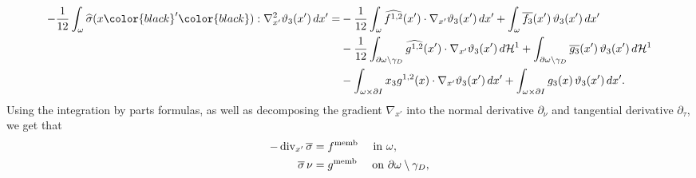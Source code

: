 \documentclass[reqno,10pt]{amsart}
\numberwithin{equation}{section}
\theoremstyle{remark}
\newcommand{\RED}{\color{black}}
\newcommand{\BLACK}{\color{black}}
\newcommand{\PINK}{\color{black}}
\newcommand{\calH}{\mathcal{H}}
\renewcommand{\div}{\operatorname{div}}
\newcommand{\fvol}{f}
\newcommand{\fsurf}{g}
\newcommand{\Dir}{D}
\newcommand{\zerothI}[1]{\overline{#1}}
\newcommand{\firstI}[1]{\widehat{#1}}
\newcommand{\D}{\nabla}
\begin{document}
\begin{equation*}
\begin{split}
	-\frac{1}{12} \int_{\omega} \firstI{\sigma}(x{\RED'\BLACK}) : {\D}^2_{x'}\vartheta_3(x') \,dx' 
	=& -\frac{1}{12} \int_{\omega} \firstI{\fvol^{1,2}}(x') \cdot \nabla_{x'}\vartheta_3(x') \,dx'
	+ \int_{\omega} \zerothI{\fvol_{3}}(x') \, \vartheta_3(x') \,dx'
	\\& -\frac{1}{12} \int_{\partial{\omega} \setminus \gamma_\Dir} \firstI{\fsurf^{1,2}}(x') \cdot \nabla_{x'}\vartheta_3(x') \,d\calH^{1}
	+ \int_{\partial{\omega} \setminus \gamma_\Dir} \zerothI{\fsurf_{3}}(x') \, \vartheta_3(x') \,d\calH^{1}
	\\& - \int_{\omega \times \partial{I}} x_3 \fsurf^{1,2}(x) \cdot \nabla_{x'}\vartheta_3(x') \,dx'
	+ \int_{\omega \times \partial{I}} \fsurf_{3}(x) \, \vartheta_3(x') \,dx'
	.
\end{split}
\end{equation*}
Using the integration by parts formulas,
as well as decomposing the gradient $\nabla_{x'}$ into the normal derivative $\partial_{\nu}$ and tangential derivative $\partial_{\tau}$,
we get that
\begin{equation} \label{stress membrane equation} 
\begin{split}
	-\div_{x'}\zerothI{\sigma} & = f^{\rm memb} 
	\quad \text{ in } \omega,
	\\ \zerothI{\sigma}\,\nu & = g^{\rm memb} \quad \text{ on } \partial{\omega} \setminus \gamma_\Dir,
\end{split}
\end{equation}
\end{document}
